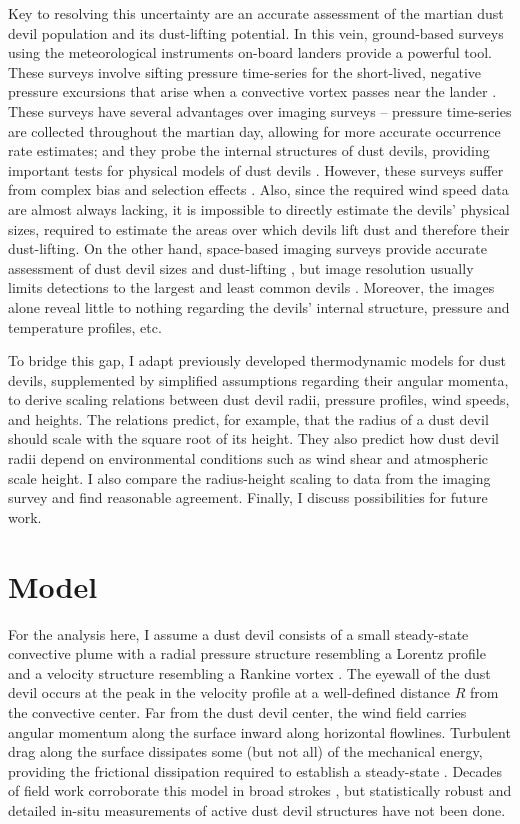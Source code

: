 \documentclass{aastex63}
\begin{document}
Key to resolving this uncertainty are an accurate assessment of the martian dust devil population and its dust-lifting potential. In this vein, ground-based surveys using the meteorological instruments on-board landers provide a powerful tool. These surveys involve sifting pressure time-series for the short-lived, negative pressure excursions that arise when a convective vortex passes near the lander \citep[e.g.][]{Ellehoj_2010, 2018Icar..299..308O}. These surveys have several advantages over imaging surveys -- pressure time-series are collected throughout the martian day, allowing for more accurate occurrence rate estimates; and they probe the internal structures of dust devils, providing important tests for physical models of dust devils \citep{2000JGR...105.1859R}. However, these surveys suffer from complex bias and selection effects \citep{2018Icar..299..166J}. Also, since the required wind speed data are almost always lacking, it is impossible to directly estimate the devils' physical sizes, required to estimate the areas over which devils lift dust and therefore their dust-lifting. On the other hand, space-based imaging surveys provide accurate assessment of dust devil sizes and dust-lifting \citep{2006JGRE..11112002C}, but image resolution usually limits detections to the largest and least common devils \citep{2009Icar..203..683L}. Moreover, the images alone reveal little to nothing regarding the devils' internal structure, pressure and temperature profiles, etc.

To bridge this gap, I adapt previously developed thermodynamic models for dust devils, supplemented by simplified assumptions regarding their angular momenta, to derive scaling relations between dust devil radii, pressure profiles, wind speeds, and heights. The relations predict, for example, that the radius of a dust devil should scale with the square root of its height. They also predict how dust devil radii depend on environmental conditions such as wind shear and atmospheric scale height. I also compare the radius-height scaling to data from the imaging survey \citet{2008Icar..197...39S} and find reasonable agreement. Finally, I discuss possibilities for future work.

\section{Model} \label{sec:model}
For the analysis here, I assume a dust devil consists of a small steady-state convective plume with a radial pressure structure resembling a Lorentz profile and a velocity structure resembling a Rankine vortex \citep{2016SSRv..203..209K}. The eyewall of the dust devil occurs at the peak in the velocity profile at a well-defined distance $R$ from the convective center. Far from the dust devil center, the wind field carries angular momentum along the surface inward along horizontal flowlines. Turbulent drag along the surface dissipates some (but not all) of the mechanical energy, providing the frictional dissipation required to establish a steady-state \citep{1998JAtS...55.3244R}. Decades of field work corroborate this model in broad strokes \citep[e.g.][]{2016SSRv..203...39M}, but statistically robust and detailed in-situ measurements of active dust devil structures have not been done.
\end{document}

